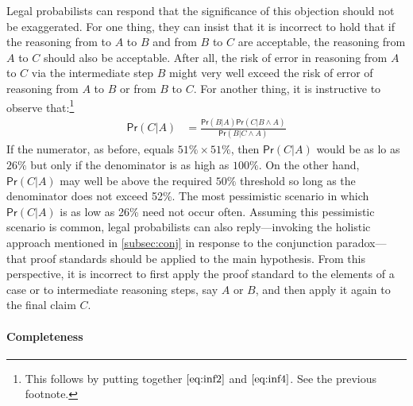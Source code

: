 \documentclass{article}
\newcommand{\pr}{\mathsf{Pr}}
\begin{document}
 Legal probabilists
 can respond that the significance of this  objection should not be exaggerated.  %
For one thing, they can insist that it is incorrect to hold that if the reasoning from to $A$ to $B$ and from $B$ to $C$ are acceptable, the reasoning from $A$ to $C$ should also be acceptable. After all, the risk of error in reasoning from $A$ to $C$ via the intermediate step $B$ might  very well exceed the risk of error of reasoning from $A$ to $B$ or from $B$ to $C$.
For another thing, it is instructive to observe that:\footnote{This follows by putting together $\eqref{eq:inf2}$ and $\eqref{eq:inf4}$. See the previous  footnote.}
\begin{align*}
    \pr(C\vert A) & = \frac{\pr(B \vert A) \pr(C\vert B \wedge A)}{\pr(B\vert C\wedge A)} 
\end{align*}
If the numerator, as before, equals $51\% \times 51\%$, then $\pr(C\vert A)$ would be as lo as $26\%$ but only if the denominator is as high as $100\%$. On the other hand, $\pr(C\vert A)$
may well be above the required $50\%$ threshold so long as  the denominator does not exceed 52\%. 
The most pessimistic scenario in which $\pr(C \vert A)$ is as low as 26\% %
need not occur often. %
 Assuming this pessimistic scenario is common, legal probabilists can also reply---invoking the holistic approach mentioned in \ref{subsec:conj} in response to the conjunction paradox---that  proof standards should be applied to the main hypothesis. From this perspective, it is incorrect to first apply the proof standard to the elements of a case or to intermediate reasoning steps, say $A$ or $B$, and then apply it again to the final claim $C$.

\paragraph{Completeness}
\end{document}
